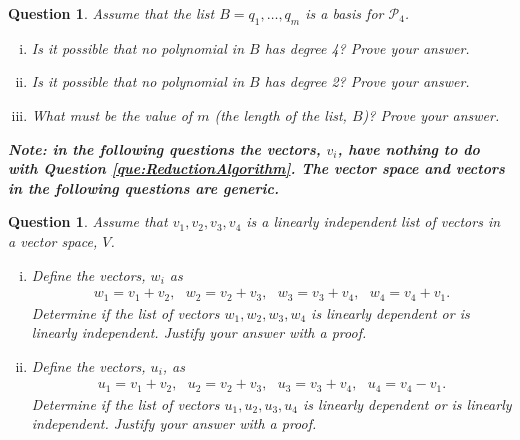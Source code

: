 \documentclass[12pt]{article}
\newtheorem{question}[thm]{Question}
\def\P{\mathcal P}
\begin{document}
\begin{question}
	\normalfont
	Assume that the list $B= q_1, \dots, q_m $ \hspace{.1cm} is a basis for $\P_4$.
	\begin{enumerate}[(i)]
		\item Is it possible that no polynomial in $B$ has degree 4? Prove your answer.
		\item Is it possible that no polynomial in $B$ has degree 2? Prove your answer.
		\item What must be the value of $m$ (the length of the list, $B$)?  Prove your answer. \\
	\end{enumerate}
\end{question}

\vspace{.3cm}

\noindent \textbf{\emph{Note: in the following questions the vectors, $v_i$, have nothing to do with Question \ref{que:ReductionAlgorithm}. The vector space and vectors in the following questions are generic.}} \\


\begin{question}
	\normalfont
	
		
	\noindent Assume that \hspace{.1cm} $v_1, v_2, v_3, v_4$ \hspace{.1cm} is a linearly independent list of vectors in a vector space, $V$.
	
	\begin{enumerate}[(i)]
		\item Define the vectors, $w_i$ as
		\begin{align*}
			w_1 = v_1 + v_2,\ \ \ 
			w_2 = v_2 + v_3,\ \ \ 
			w_3 = v_3 + v_4,\ \ \
			w_4 = v_4 + v_1.
		\end{align*}
		Determine if the list of vectors \hspace{.1cm} $w_1, w_2, w_3, w_4$ \hspace{.1cm} is linearly dependent or is linearly independent. Justify your answer with a proof.		
		\item Define the vectors, $u_i$, as
		\begin{align*}
			u_1 = v_1 + v_2,\ \ \ 
			u_2 = v_2 + v_3,\ \ \ 
			u_3 = v_3 + v_4,\ \ \
			u_4 = v_4 - v_1.
		\end{align*}
		Determine if the list of vectors \hspace{.1cm}  $ u_1, u_2, u_3, u_4 $  \hspace{.1cm} is linearly dependent or is linearly independent.  Justify your answer with a proof.	
	\end{enumerate}
\end{question}
\end{document}
